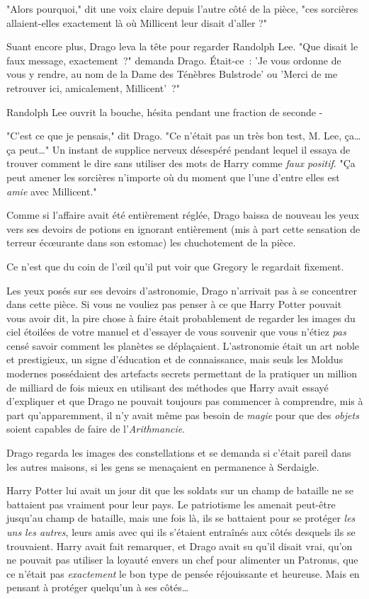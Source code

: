 "Alors pourquoi," dit une voix claire depuis l'autre côté de la pièce, "ces sorcières allaient-elles exactement là où Millicent leur disait d'aller ?"

Suant encore plus, Drago leva la tête pour regarder Randolph Lee. "Que disait le faux message, exactement~?" demanda Drago. Était-ce~: 'Je vous ordonne de vous y rendre, au nom de la Dame des Ténèbres Bulstrode' ou 'Merci de me retrouver ici, amicalement, Millicent'~?"

Randolph Lee ouvrit la bouche, hésita pendant une fraction de seconde -

"C'est ce que je pensais," dit Drago. "Ce n'était pas un très bon test, M. Lee, ça… ça peut…" Un instant de supplice nerveux désespéré pendant lequel il essaya de trouver comment le dire sans utiliser des mots de Harry comme \emph{faux positif}. "Ça peut amener les sorcières n'importe où du moment que l'une d'entre elles est \emph{amie} avec Millicent."

Comme si l'affaire avait été entièrement réglée, Drago baissa de nouveau les yeux vers ses devoirs de potions en ignorant entièrement (mis à part cette sensation de terreur écœurante dans son estomac) les chuchotement de la pièce.

Ce n'est que du coin de l'œil qu'il put voir que Gregory le regardait fixement.

\later

Les yeux posés sur ses devoirs d'astronomie, Drago n'arrivait pas à se concentrer dans cette pièce. Si vous ne vouliez pas penser à ce que Harry Potter pouvait vous avoir dit, la pire chose à faire était probablement de regarder les images du ciel étoilées de votre manuel et d'essayer de vous souvenir que vous n'étiez \emph{pas} censé savoir comment les planètes se déplaçaient. L'astronomie était un art noble et prestigieux, un signe d'éducation et de connaissance, mais seuls les Moldus modernes possédaient des artefacts secrets permettant de la pratiquer un million de milliard de fois mieux en utilisant des méthodes que Harry avait essayé d'expliquer et que Drago ne pouvait toujours pas commencer à comprendre, mis à part qu'apparemment, il n'y avait même pas besoin de \emph{magie} pour que des \emph{objets} soient capables de faire de l'\emph{Arithmancie}.

Drago regarda les images des constellations et se demanda si c'était pareil dans les autres maisons, si les gens se menaçaient en permanence à Serdaigle.

Harry Potter lui avait un jour dit que les soldats sur un champ de bataille ne se battaient pas vraiment pour leur pays. Le patriotisme les amenait peut-être jusqu'au champ de bataille, mais une fois là, ils se battaient pour se protéger \emph{les uns les autres}, leurs amis avec qui ils s'étaient entraînés aux côtés desquels ils se trouvaient. Harry avait fait remarquer, et Drago avait su qu'il disait vrai, qu'on ne pouvait pas utiliser la loyauté envers un chef pour alimenter un Patronus, que ce n'était pas \emph{exactement} le bon type de pensée réjouissante et heureuse. Mais en pensant à protéger quelqu'un à ses côtés…

